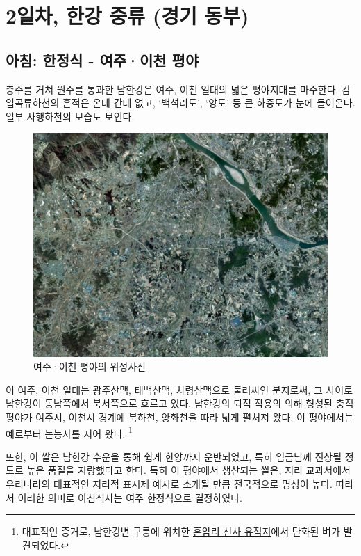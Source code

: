 \chapter{2일차, 한강 중류 (경기 동부)}
\section{아침: 한정식 - 여주·이천 평야}
충주를 거쳐 원주를 통과한 남한강은 여주, 이천 일대의 넓은 평야지대를 마주한다. 
감입곡류하천의 흔적은 온데 간데 없고, ‘백석리도’, ‘양도’ 등 큰 하중도가 눈에 들어온다.
일부 사행하천의 모습도 보인다.

\begin{figure}[ht]
    \centering
    \includegraphics[width=.6\textwidth]{img/여주이천평야.jpg}
    \caption{여주·이천 평야의 위성사진\protect\footnotemark}
    \label{fig:my_label}
\end{figure}


이 여주, 이천 일대는 
광주산맥, 태백산맥, 차령산맥으로 둘러싸인 분지로써,
그 사이로 남한강이 동남쪽에서 북서쪽으로 흐르고 있다.
남한강의 퇴적 작용의 의해 형성된 충적평야가 여주시, 이천시 경계에 북하천, 양화천을 따라 넓게 펼처져 왔다.
이 평야에서는 예로부터 논농사를 지어 왔다.
\footnote{대표적인 증거로, 남한강변 구릉에 위치한 \href{https://terms.naver.com/entry.naver?docId=1793906&cid=49217&categoryId=49217}{혼암리 선사 유적지}에서 탄화된 벼가 발견되었다.}


또한, 이 쌀은 남한강 수운을 통해 쉽게 한양까지 운반되었고, 특히 임금님께 진상될 정도로 높은 품질을 자랑했다고 한다.
특히 이 평야에서 생산되는 쌀은, 지리 교과서에서 우리나라의 대표적인 지리적 표시제 예시로 소개될 만큼 전국적으로 명성이 높다.
따라서 이러한 의미로 아침식사는 여주 한정식으로 결정하였다.
 

